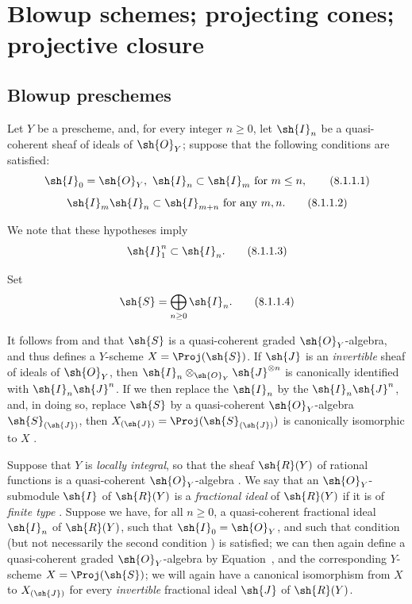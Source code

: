 \section{Blowup schemes; projecting cones; projective closure}
\label{section:II.8}

\subsection{Blowup preschemes}
\label{subsection:II.8.1}
\label{II.8.1}

\begin{env}[8.1.1]
\label{II.8.1.1}
Let $Y$ be a prescheme, and, for every integer $n\geq 0$, let $\sh{I}_n$ be a quasi-coherent sheaf of ideals of $\sh{O}_Y$; suppose that the following conditions are satisfied:
\[
\label{II.8.1.1.1}
  \sh{I}_0=\sh{O}_Y,\ \sh{I}_n\subset\sh{I}_m\text{ for }m\leq n,
\tag{8.1.1.1}
\]
\[
\label{II.8.1.1.2}
  \sh{I}_m\sh{I}_n\subset\sh{I}_{m+n}\text{ for any }m,n.
\tag{8.1.1.2}
\]

We note that these hypotheses imply
\[
\label{II.8.1.1.3}
  \sh{I}_1^n\subset\sh{I}_n.
\tag{8.1.1.3}
\]

Set
\[
\label{II.8.1.1.4}
  \sh{S}=\bigoplus_{n\geq 0}\sh{I}_n.
\tag{8.1.1.4}
\]

It follows from  and  that $\sh{S}$ is a quasi-coherent graded $\sh{O}_Y$-algebra, and thus defines a $Y$-scheme $X=\Proj(\sh{S})$.
If $\sh{J}$ is an \emph{invertible} sheaf of ideals of $\sh{O}_Y$, then $\sh{I}_n\otimes_{\sh{O}_Y}\sh{J}^{\otimes n}$ is canonically identified with $\sh{I}_n\sh{J}^n$.
If we then replace the $\sh{I}_n$ by the $\sh{I}_n\sh{J}^n$, and, in doing so, replace $\sh{S}$ by a quasi-coherent $\sh{O}_Y$-algebra $\sh{S}_{(\sh{J})}$, then $X_{(\sh{J})}=\Proj(\sh{S}_{(\sh{J})})$ is canonically isomorphic to $X$ .
\end{env}

\begin{env}[8.1.2]
\label{II.8.1.2}
Suppose that $Y$ is \emph{locally integral}, so that the sheaf $\sh{R}(Y)$ of rational functions is a quasi-coherent $\sh{O}_Y$-algebra .
We say that an $\sh{O}_Y$-submodule $\sh{I}$ of $\sh{R}(Y)$ is a \emph{fractional ideal} of $\sh{R}(Y)$ if it is of \emph{finite type} .
Suppose we have, for all $n\geq0$, a quasi-coherent fractional ideal $\sh{I}_n$ of $\sh{R}(Y)$, such that $\sh{I}_0 = \sh{O}_Y$, and such that condition  (but not necessarily the second condition ) is satisfied;
we can then again define a quasi-coherent graded $\sh{O}_Y$-algebra by Equation~, and the corresponding $Y$-scheme $X = \Proj(\sh{S})$;
we will again have a canonical isomorphism from $X$ to $X_{(\sh{J})}$ for every \emph{invertible} fractional ideal $\sh{J}$ of $\sh{R}(Y)$.
\end{env}

